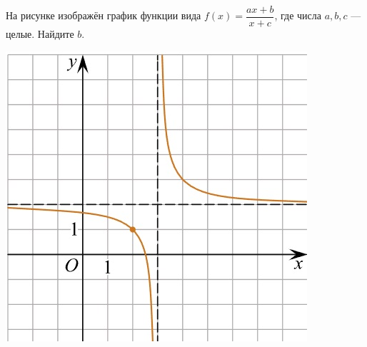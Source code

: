 \begin{class}[number=6]
\begin{listofex}
\begin{minipage}[c]{0.28\textwidth}
		\end{minipage}
		\item
		\begin{minipage}[t]{0.67\textwidth}
			На рисунке изображён график функции вида \(f(x)=\dfrac{ax+b}{x+c}\), где числа \(a, b, c\) --- целые. Найдите \(b\).
		\end{minipage}
		\begin{minipage}[c]{0.28\textwidth}
			\includegraphics[align=t, width=\textwidth]{pics/G101M4C6-7.jpg}
		\end{minipage}
	\end{listofex}
\end{class}
%
%
%	
